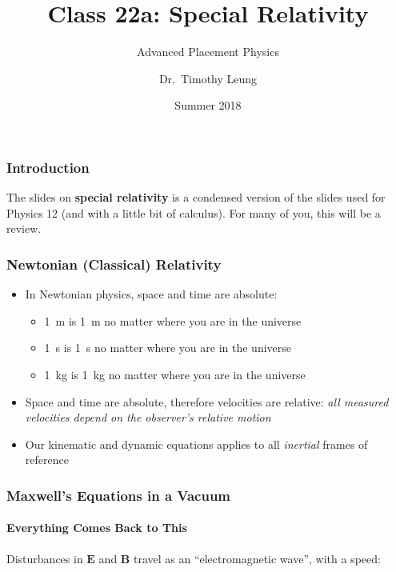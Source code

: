\documentclass[12pt,compress,aspectratio=169]{beamer}
\title{Class 22a: Special Relativity}
\subtitle{Advanced Placement Physics}
\author[TML]{Dr.\ Timothy Leung}
\institute{Olympiads School}
\date{Summer 2018}
\newcommand{\mb}[1]{\mathbf{#1}}
\begin{document}
\begin{frame}
  \maketitle
\end{frame}


\begin{frame}
  \frametitle{Introduction}
  The slides on \textbf{special relativity} is a condensed version of the
  slides used for Physics 12 (and with a little bit of calculus). For many of
  you, this will be a review.
\end{frame}


\begin{frame}
  \frametitle{Newtonian (Classical) Relativity}
  \begin{itemize}
  \item In Newtonian physics, space and time are absolute:
    \begin{itemize}
    \item \SI{1}{m} is \SI{1}{m} no matter where you are in the universe
    \item \SI{1}{s} is \SI{1}{s} no matter where you are in the universe
    \item \SI{1}{kg} is \SI{1}{kg} no matter where you are in the universe
    \end{itemize}
  \item Space and time are absolute, therefore velocities are relative:
    \emph{all measured velocities depend on the observer's relative motion}
  \item Our kinematic and dynamic equations applies to all \emph{inertial}
    frames of reference
  \end{itemize}
\end{frame}


\begin{frame}
  \frametitle{Maxwell's Equations in a Vacuum}
  \framesubtitle{Everything Comes Back to This}

  \vspace{-.3in}{\Large
    \begin{align*}
      \nabla\cdot\mb{E} &= 0\\
      \nabla\cdot\mb{B} &= 0\\
      \nabla\times\mb{E} &=-\frac{\partial\mb{B}}{\partial t}\\
      \nabla\times\mb{B} &=\mu_o\varepsilon_o\frac{\partial\mb{E}}{\partial t}
    \end{align*}
  }
  
  \vspace{-.15in}Disturbances in $\mb{E}$ and $\mb{B}$ travel as an
  ``electromagnetic wave'', with a speed:

\end{frame}
\end{document}
